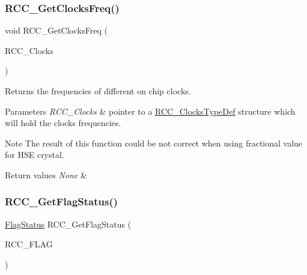 \subsubsection{\texorpdfstring{RCC\_GetClocksFreq()}{RCC\_GetClocksFreq()}}
{\footnotesize\ttfamily void R\+C\+C\+\_\+\+Get\+Clocks\+Freq (\begin{DoxyParamCaption}\item[{\mbox{\hyperlink{struct_r_c_c___clocks_type_def}{R\+C\+C\+\_\+\+Clocks\+Type\+Def}} $\ast$}]{R\+C\+C\+\_\+\+Clocks }\end{DoxyParamCaption})}



Returns the frequencies of different on chip clocks. 


\begin{DoxyParams}{Parameters}
{\em R\+C\+C\+\_\+\+Clocks} & pointer to a \mbox{\hyperlink{struct_r_c_c___clocks_type_def}{R\+C\+C\+\_\+\+Clocks\+Type\+Def}} structure which will hold the clocks frequencies. \\
\hline
\end{DoxyParams}
\begin{DoxyNote}{Note}
The result of this function could be not correct when using fractional value for H\+SE crystal.
\end{DoxyNote}

\begin{DoxyRetVals}{Return values}
{\em None} & \\
\hline
\end{DoxyRetVals}
\mbox{\label{group___r_c_c___private___functions_ga2897bdc52f272031c44fb1f72205d295}} 
\subsubsection{\texorpdfstring{RCC\_GetFlagStatus()}{RCC\_GetFlagStatus()}}
{\footnotesize\ttfamily \mbox{\hyperlink{group___exported__types_ga89136caac2e14c55151f527ac02daaff}{Flag\+Status}} R\+C\+C\+\_\+\+Get\+Flag\+Status (\begin{DoxyParamCaption}\item[{uint8\+\_\+t}]{R\+C\+C\+\_\+\+F\+L\+AG }\end{DoxyParamCaption})}



